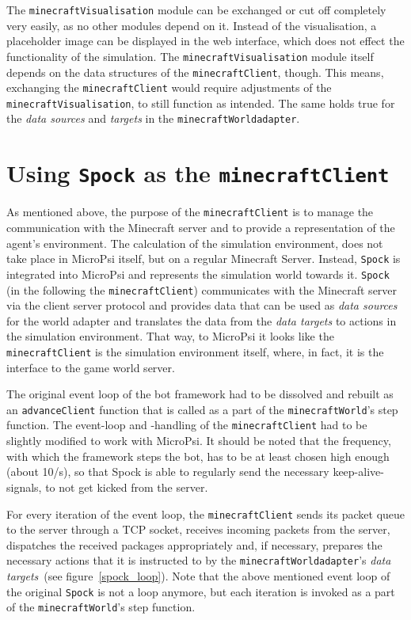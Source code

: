 The \texttt{minecraftVisualisation} module can be exchanged or cut off completely very easily, as no other modules depend on it. Instead of the visualisation, a placeholder image can be displayed in the web interface, which does not effect the functionality of the simulation. The \texttt{minecraftVisualisation} module itself depends on the data structures of the \texttt{minecraftClient}, though. This means, exchanging the \texttt{minecraftClient} would require adjustments of the \texttt{minecraftVisualisation}, to still function as intended. The same holds true for the \emph{data sources} and \emph{targets} in the \texttt{minecraftWorldadapter}.

    \section{Using \texttt{Spock} as the \texttt{minecraftClient}}

As mentioned above, the purpose of the \texttt{minecraftClient} is to manage the communication with the Minecraft server and to provide a representation of the agent's environment. The calculation of the simulation environment, does not take place in MicroPsi itself, but on a regular Minecraft Server. Instead, \texttt{Spock} is integrated into MicroPsi and represents the simulation world towards it. \texttt{Spock} (in the following the \texttt{minecraftClient}) communicates with the Minecraft server via the client server protocol and provides data that can be used as \emph{data sources} for the world adapter and translates the data from the \emph{data targets} to actions in the simulation environment. That way, to MicroPsi it looks like the \texttt{minecraftClient} is the simulation environment itself, where, in fact, it is the interface to the game world server.


The original event loop of the bot framework had to be dissolved and rebuilt as an \texttt{advanceClient} function that is called as a part of the \texttt{minecraftWorld}'s step function. The event-loop and -handling of the \texttt{minecraftClient} had to be slightly modified to work with MicroPsi. It should be noted that the frequency, with which the framework steps the bot, has to be at least chosen high enough (about 10/s), so that Spock is able to regularly send the necessary keep-alive-signals, to not get kicked from the server.

For every iteration of the event loop, the \texttt{minecraftClient} sends its packet queue to the server through a TCP socket, receives incoming packets from the server, dispatches the received packages appropriately and, if necessary, prepares the necessary actions that it is instructed to by the \texttt{minecraftWorldadapter}'s \emph{data targets}~(see figure~\ref{spock_loop}). Note that the above mentioned event loop of the original \texttt{Spock} is not a loop anymore, but each iteration is invoked as a part of the \texttt{minecraftWorld}'s step function.

